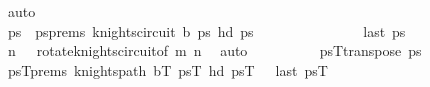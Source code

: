 \begin{isabellebody}
\ auto\isanewline
\ \ \ \ \ \ \ \ \ \ \isamarkupfalse%
\isanewline
\ \ \ \ \ \ \ \ \isamarkupfalse%
\isanewline
\ \ \ \ \ \ \ \ \isamarkupfalse%
\ \isamarkupfalse%
\ ps\ \ psprems{\isacharcolon}{\kern0pt}\ {\isachardoublequoteopen}knights{\isacharunderscore}{\kern0pt}circuit\ {\isacharquery}{\kern0pt}b\ ps\ {\isachardoublequoteopen}hd\ ps\ {\isacharequal}{\kern0pt}\ {\isacharparenleft}{\kern0pt}{}{\isacharcomma}{\kern0pt}{}{\isacharparenright}{\kern0pt}{\isachardoublequoteclose}\ \isanewline
\ \ \ \ \ \ \ \ \ \ \ \ {\isachardoublequoteopen}last\ ps\ {\isacharequal}{\kern0pt}\ {\isacharparenleft}{\kern0pt}{}{\isacharcomma}{\kern0pt}{}{\isacharparenright}{\kern0pt}{\isachardoublequoteclose}\isanewline
\ \ \ \ \ \ \ \ \ \ \isamarkupfalse%
\ {\isacartoucheopen}n{\isacharminus}{\kern0pt}{}\ {\isasymge}\ {}{\isacartoucheclose}\ rotate{\isacharunderscore}{\kern0pt}knights{\isacharunderscore}{\kern0pt}circuit{\isacharbrackleft}{\kern0pt}of\ m\ {\isachardoublequoteopen}n{\isacharminus}{\kern0pt}{}{\isachardoublequoteclose}{\isacharbrackright}{\kern0pt}\ \isamarkupfalse%
\ auto\isanewline
\ \ \ \ \ \ \ \ \isamarkupfalse%
\ {\isacharquery}{\kern0pt}psT{\isacharequal}{\kern0pt}{\isachardoublequoteopen}transpose\ ps\isanewline
\ \ \ \ \ \ \ \ \isamarkupfalse%
\ psT{\isacharunderscore}{\kern0pt}prems{\isacharcolon}{\kern0pt}\ {\isachardoublequoteopen}knights{\isacharunderscore}{\kern0pt}path\ {\isacharquery}{\kern0pt}bT\ {\isacharquery}{\kern0pt}psT{\isachardoublequoteclose}\ {\isachardoublequoteopen}hd\ {\isacharquery}{\kern0pt}psT\ {\isacharequal}{\kern0pt}\ {\isacharparenleft}{\kern0pt}{}{\isacharcomma}{\kern0pt}{}{\isacharparenright}{\kern0pt}{\isachardoublequoteclose}\ {\isachardoublequoteopen}last\ {\isacharquery}{\kern0pt}psT\ {\isacharequal}{\kern0pt}\ {\isacharparenleft}{\kern0pt}{}{\isacharcomma}{\kern0pt}{}{\isacharparenright}{\kern0pt}{\isachardoublequoteclose}\isanewline

\end{isabellebody}
